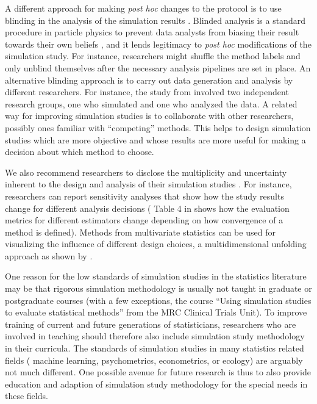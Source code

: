 \documentclass[a4paper, 11pt]{article}
\begin{document}
A different approach for making \emph{post hoc} changes to the protocol is to use
blinding in the analysis of the simulation results \citep{Dutilh2019}. 
Blinded analysis is a standard procedure in particle physics to prevent
data analysts from biasing their result towards their own beliefs 
\citep{Klein2005}, and it lends 
legitimacy to \emph{post hoc} modifications of the simulation study.
For instance, researchers might shuffle the method labels and only unblind themselves 
after the necessary analysis pipelines are set in place. An alternative blinding
approach is to carry out data generation and
analysis by different researchers.
For instance, the study from \citet{Kreutz2020} involved two independent research groups,
one who simulated and one who analyzed the data.
A related way for improving simulation studies is to collaborate with other
researchers, possibly ones familiar with ``competing'' methods. This helps to
design simulation studies which are more objective and whose results are more
useful for making a decision about which method to choose. 

We also recommend researchers to disclose the multiplicity and
uncertainty inherent to the design and analysis of their simulation studies 
\citep{Hoffmann2021}. For instance, researchers can report sensitivity analyses 
that show how the study results change for different analysis decisions 
(\eg{} Table 4 in \citet{vanSmeden2016} shows how the evaluation
metrics for different estimators change depending on how convergence
of a method is defined). Methods from multivariate statistics can be used for
visualizing the influence of different design choices, \eg{} a multidimensional
unfolding approach as shown by \citet{Niessl2021}.

One reason for the low standards of simulation studies in the
statistics literature may be that rigorous simulation 
methodology is usually not taught in graduate or postgraduate
courses (with a few exceptions, \eg{} the course 
``Using simulation studies to evaluate statistical methods'' 
from the MRC Clinical Trials Unit). 
To improve training of current and future generations of statisticians, researchers who are
involved in teaching should therefore also include simulation
study methodology in their curricula. 
The standards of simulation studies in many statistics
related fields (\eg{} machine learning, psychometrics, econometrics,
or ecology) are arguably
not much different. One possible avenue for future research is
thus to also
provide education and adaption of simulation study methodology 
for the special needs in these fields.
\end{document}
